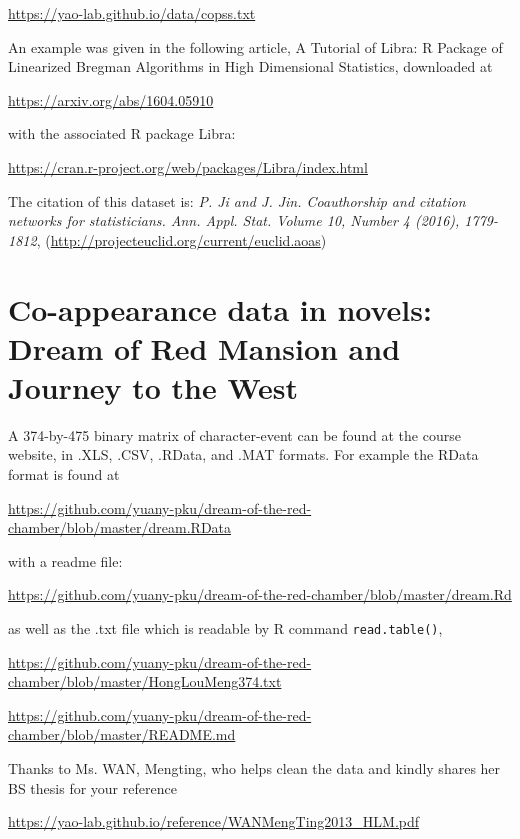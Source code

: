 \documentclass[11pt]{article}
\begin{document}
\url{https://yao-lab.github.io/data/copss.txt} 

\noindent An example was given in the following article, A Tutorial of Libra: R Package of Linearized Bregman Algorithms in High Dimensional Statistics, downloaded at

\url{https://arxiv.org/abs/1604.05910}

\noindent with the associated R package Libra:

\url{https://cran.r-project.org/web/packages/Libra/index.html}

The citation of this dataset is: \emph{P. Ji and J. Jin. Coauthorship and citation networks for statisticians. Ann. Appl. Stat. Volume 10, Number 4 (2016), 1779-1812}, (\url{http://projecteuclid.org/current/euclid.aoas})




\section{Co-appearance data in novels: Dream of Red Mansion and Journey to the West}

A 374-by-475 binary matrix of character-event can be found at the course website, in .XLS, .CSV, .RData, and .MAT formats. For example the RData format is found at

\url{https://github.com/yuany-pku/dream-of-the-red-chamber/blob/master/dream.RData}

\noindent with a readme file:

\url{https://github.com/yuany-pku/dream-of-the-red-chamber/blob/master/dream.Rd}

\noindent as well as the .txt file which is readable by R command {\tt read.table()},

\url{https://github.com/yuany-pku/dream-of-the-red-chamber/blob/master/HongLouMeng374.txt}

\url{https://github.com/yuany-pku/dream-of-the-red-chamber/blob/master/README.md}

Thanks to Ms. WAN, Mengting, who helps clean the data and kindly shares her BS thesis for your reference
 
\url{https://yao-lab.github.io/reference/WANMengTing2013_HLM.pdf}

%
\end{document}
